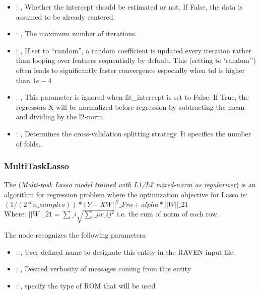 \begin{itemize}
    \item {}: , 
      Whether the intercept should be estimated or not. If False,
      the data is assumed to be already centered.

    \item {}: , 
      The maximum number of iterations.

    \item {}: , 
      If set to ``random'', a random coefficient is updated every iteration
      rather than looping over features sequentially by default. This (setting to `random'')
      often leads to significantly faster convergence especially when tol is higher than $1e-4$

    \item {}: , 
      This parameter is ignored when fit\_intercept is set to False. If True,
      the regressors X will be normalized before regression by subtracting the mean and
      dividing by the l2-norm.

    \item {}: , 
      Determines the cross-validation splitting strategy.
      It specifies the number of folds..
  \end{itemize}


\subsubsection{MultiTaskLasso}
  The  (\textit{Multi-task Lasso model trained                         with
  L1/L2 mixed-norm as regularizer}) is an algorithm for regression problem
  where the optimization objective for Lasso is:                         $(1 / (2 * n\_samples)) *
  ||Y - XW||^2\_{Fro} + alpha * ||W||\_{21}$                         \\Where:
  $||W||\_{21} = \sum\_i \sqrt{\sum\_j w\_{ij}^2}$                         i.e. the sum of norm of each
  row.                         

  The  node recognizes the following parameters:
    \begin{itemize}
      \item {}: , 
        User-defined name to designate this entity in the RAVEN input file.
      \item {}: , 
        Desired verbosity of messages coming from this entity
      \item {}: , 
        specify the type of ROM that will be used
  \end{itemize}

